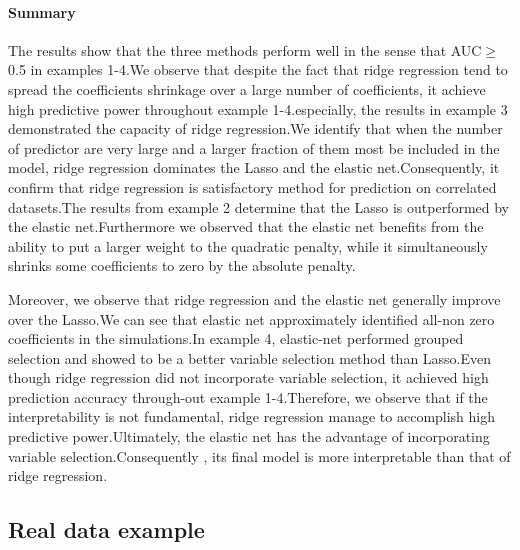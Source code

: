 \documentclass[12pt]{report}
\begin{document}
{	\paragraph{Summary}
	The results show that the three methods perform well in the sense that AUC$\geq$0.5 in examples 1-4.We observe that despite the fact that ridge regression tend to spread the coefficients shrinkage over a large number of coefficients, it achieve high predictive power throughout example 1-4.especially, the results in example 3 demonstrated the capacity of ridge regression.We identify that when the number of predictor are very large and a larger fraction of them most be included in the model, ridge regression dominates the Lasso and the elastic net.Consequently, it confirm that ridge regression is satisfactory method for prediction on correlated datasets.The results from example 2 determine that the Lasso is outperformed by the elastic net.Furthermore we observed that the elastic net benefits from the ability to put a larger weight to the quadratic penalty, while it simultaneously shrinks some coefficients to zero by the absolute penalty.
	
	Moreover, we observe that ridge regression and the elastic net generally improve over the Lasso.We can see that elastic net approximately identified all-non zero coefficients in the simulations.In example 4, elastic-net performed grouped selection and showed to be a better variable selection method than Lasso.Even though ridge regression did not incorporate variable selection, it achieved high prediction accuracy through-out example 1-4.Therefore, we observe that if the interpretability is not fundamental, ridge regression manage to accomplish high predictive power.Ultimately, the elastic net has the advantage of incorporating variable selection.Consequently , its final model is more interpretable than that of ridge regression.\\
	\subsection{Real data example}
}
\end{document}
